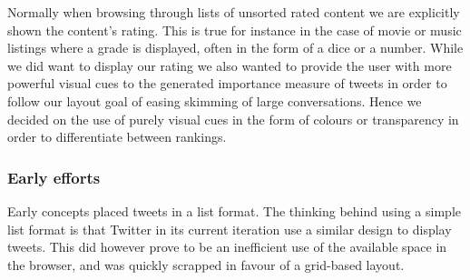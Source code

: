Normally when browsing through lists of unsorted rated content we are explicitly shown the content's rating. This is true for instance in the case of movie or music listings where a grade is displayed, often in the form of a dice or a number. While we did want to display our rating we also wanted to provide the user with more powerful visual cues to the generated importance measure of tweets in order to follow our layout goal of easing skimming of large conversations. Hence we decided on the use of purely visual cues in the form of colours or transparency in order to differentiate between rankings.

\subsubsection{Early efforts}
Early concepts placed tweets in a list format. The thinking behind using a simple list format is that Twitter in its current iteration use a similar design to display tweets. This did however prove to be an inefficient use of the available space in the browser, and was quickly scrapped in favour of a grid-based layout.


